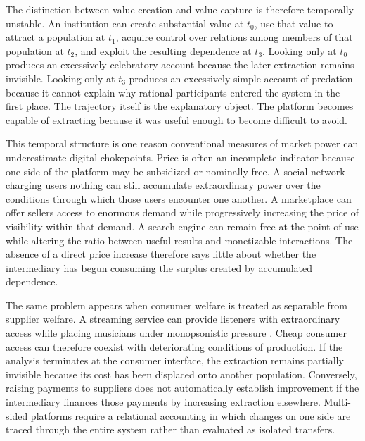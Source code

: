 \documentclass[11pt]{article}
\begin{document}
The distinction between value creation and value capture is therefore temporally unstable. An institution can create substantial value at \(t_0\), use that value to attract a population at \(t_1\), acquire control over relations among members of that population at \(t_2\), and exploit the resulting dependence at \(t_3\). Looking only at \(t_0\) produces an excessively celebratory account because the later extraction remains invisible. Looking only at \(t_3\) produces an excessively simple account of predation because it cannot explain why rational participants entered the system in the first place. The trajectory itself is the explanatory object. The platform becomes capable of extracting because it was useful enough to become difficult to avoid.

This temporal structure is one reason conventional measures of market power can underestimate digital chokepoints. Price is often an incomplete indicator because one side of the platform may be subsidized or nominally free. A social network charging users nothing can still accumulate extraordinary power over the conditions through which those users encounter one another. A marketplace can offer sellers access to enormous demand while progressively increasing the price of visibility within that demand. A search engine can remain free at the point of use while altering the ratio between useful results and monetizable interactions. The absence of a direct price increase therefore says little about whether the intermediary has begun consuming the surplus created by accumulated dependence.

The same problem appears when consumer welfare is treated as separable from supplier welfare. A streaming service can provide listeners with extraordinary access while placing musicians under monopsonistic pressure \citep{eriksson2019spotify,prey2020musicians,hesmondhalgh2019cultural}. Cheap consumer access can therefore coexist with deteriorating conditions of production. If the analysis terminates at the consumer interface, the extraction remains partially invisible because its cost has been displaced onto another population. Conversely, raising payments to suppliers does not automatically establish improvement if the intermediary finances those payments by increasing extraction elsewhere. Multi-sided platforms require a relational accounting in which changes on one side are traced through the entire system rather than evaluated as isolated transfers.
\end{document}
